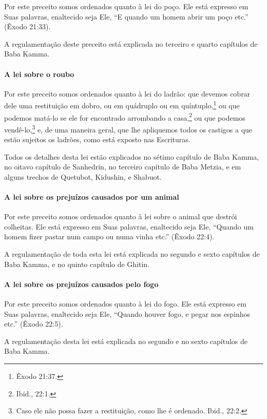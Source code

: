 Por este preceito somos ordenados quanto à lei do poço. Ele está
expresso em Suas palavras, enaltecido seja Ele, ``E quando um homem
abrir um poço etc.'' (Êxodo 21:33).

A regulamentação deste preceito está explicada no terceiro e quarto
capítulos de Baba Kamma.


\paragraph{A lei sobre o roubo}

Por este preceito somos ordenados quanto à lei do ladrão: que devemos
cobrar dele uma restituição em dobro, ou em quádruplo ou em
quíntuplo,\footnote{Êxodo 21:37.} ou que podemos matá-lo se ele for
encontrado arrombando a casa,\footnote{Ibid., 22:1.} ou que podemos
vendê-lo,\footnote{Caso ele não possa fazer a restituição, como lhe é ordenado. Ibid.,
  22:2.} e, de uma maneira geral, que lhe
apliquemos todos os castigos a que estão sujeitos os ladrões, como está
exposto nas Escrituras.

Todos os detalhes desta lei estão explicados no sétimo capítulo de Baba
Kamma, no oitavo capítulo de Sanhedrin, no terceiro capítulo de Baba
Metzia, e em alguns trechos de Quetubot, Kidushin, e Shabuot.

\paragraph{A lei sobre os prejuízos causados por um animal}

Por este preceito somos ordenados quanto à lei sobre o animal que
destrói colheitas. Ele está expresso em Suas palavras, enaltecido seja
Ele, ``Quando um homem fizer pastar num campo ou numa vinha etc.''
(Êxodo 22:4).

A regulamentação de toda esta lei está explicada no segundo e sexto
capítulos de Baba Kamma, e no quinto capítulo de Ghitin.


\paragraph{A lei sobre os prejuízos causados pelo fogo}

Por este preceito somos ordenados quanto à lei do fogo. Ele está
expresso em Suas palavras, enaltecido seja Ele, ``Quando houver fogo, e
pegar nos espinhos etc.'' (Êxodo 22:5).

A regulamentação desta lei está explicada no segundo e no sexto
capítulos de Baba Kamma.

